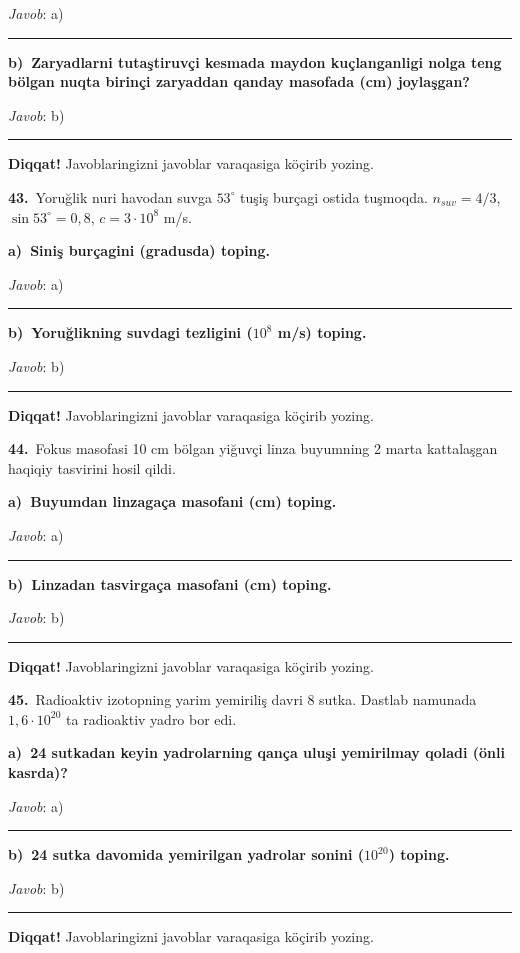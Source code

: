 \documentclass[11pt,a4paper]{article}
\newcommand{\blank}{\rule{5cm}{0.4pt}}
\begin{document}
\noindent\textit{Javob}: a)\ \blank\par
\medskip\noindent\textbf{b)\ Zaryadlarni tutaştiruvçi kesmada maydon kuçlanganligi nolga teng bölgan nuqta birinçi zaryaddan qanday masofada (cm) joylaşgan?}\par
\noindent\textit{Javob}: b)\ \blank\par
\medskip\noindent\textbf{Diqqat!} Javoblaringizni javoblar varaqasiga köçirib yozing.\par\vspace{10pt}
\noindent\textbf{43.}\ Yoruğlik nuri havodan suvga $53^\circ$ tuşiş burçagi ostida tuşmoqda. $n_{suv}=4/3$, $\sin53^\circ=0{,}8$, $c=3\cdot10^8$ m/s.\par\smallskip
\medskip\noindent\textbf{a)\ Siniş burçagini (gradusda) toping.}\par
\noindent\textit{Javob}: a)\ \blank\par
\medskip\noindent\textbf{b)\ Yoruğlikning suvdagi tezligini ($10^8$ m/s) toping.}\par
\noindent\textit{Javob}: b)\ \blank\par
\medskip\noindent\textbf{Diqqat!} Javoblaringizni javoblar varaqasiga köçirib yozing.\par\vspace{10pt}
\noindent\textbf{44.}\ Fokus masofasi 10 cm bölgan yiğuvçi linza buyumning 2 marta kattalaşgan haqiqiy tasvirini hosil qildi.\par\smallskip
\medskip\noindent\textbf{a)\ Buyumdan linzagaça masofani (cm) toping.}\par
\noindent\textit{Javob}: a)\ \blank\par
\medskip\noindent\textbf{b)\ Linzadan tasvirgaça masofani (cm) toping.}\par
\noindent\textit{Javob}: b)\ \blank\par
\medskip\noindent\textbf{Diqqat!} Javoblaringizni javoblar varaqasiga köçirib yozing.\par\vspace{10pt}
\noindent\textbf{45.}\ Radioaktiv izotopning yarim yemiriliş davri 8 sutka. Dastlab namunada $1{,}6\cdot10^{20}$ ta radioaktiv yadro bor edi.\par\smallskip
\medskip\noindent\textbf{a)\ 24 sutkadan keyin yadrolarning qança uluşi yemirilmay qoladi (önli kasrda)?}\par
\noindent\textit{Javob}: a)\ \blank\par
\medskip\noindent\textbf{b)\ 24 sutka davomida yemirilgan yadrolar sonini ($10^{20}$) toping.}\par
\noindent\textit{Javob}: b)\ \blank\par
\medskip\noindent\textbf{Diqqat!} Javoblaringizni javoblar varaqasiga köçirib yozing.\par\vspace{10pt}
\end{document}
